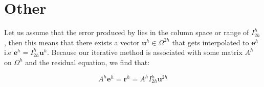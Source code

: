 \documentclass[pdftex,12pt,a4paper]{article}
\begin{document}



\section{Other}  


Let us assume that the error produced by lies in the column space or range of $I_{2h}^h$, then this means that there exists a vector $\mathbf{u}^{h} \in \Omega^{2h}$ that gets interpolated to $\mathbf{e}^h$ i.e $\mathbf{e}^h = I_{2h}^h \mathbf{u}^{h}$.  Because our iterative method is associated with some matrix $A^h$ on $\Omega^h$ and the residual equation, we find that:

$$A^h \mathbf{e}^h= \mathbf{r}^h = A^h I^h_{2h} \mathbf{u}^{2h}$$
\end{document}
